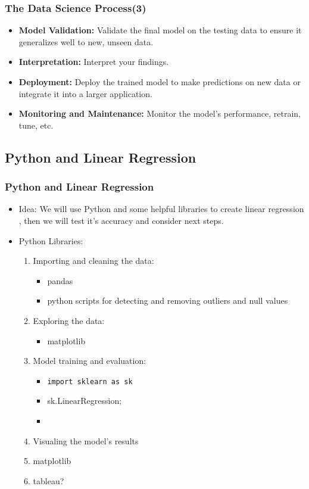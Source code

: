 \documentclass{beamer}
\newcounter{slidenum}
\begin{document}
\begin{frame}
	
	\frametitle{The Data Science Process(3)}
	{\small
	\begin{itemize}
		
  \item \textbf{Model Validation:} Validate the final model on the testing data to ensure it generalizes well to new, unseen data.

  \item \textbf{Interpretation:} Interpret your findings. 

  \item \textbf{Deployment:} Deploy the trained model to make predictions on new data or integrate it into a larger application.

 \item \textbf{Monitoring and Maintenance:} Monitor the model's performance, retrain, tune, etc.
\end{itemize}
}
\end{frame}


\begin{frame}
\section{Python and Linear Regression}
\frametitle{Python and Linear Regression}
{\small
\begin{itemize}
\item Idea: We will use Python and some helpful libraries to create linear
	regression , then we will test it's accuracy and consider next steps.
\item Python Libraries:
	\begin{enumerate}
		\item [] Importing and cleaning the data:
			\begin{itemize}
				\item pandas

				\item python scripts for detecting and removing
					outliers and null values
			\end{itemize}
		\item [] Exploring the data:
			\begin{itemize}
				\item matplotlib 
			\end{itemize}
		\item [] Model training and evaluation: 
			\begin{itemize}
		\item \lstinline{import sklearn as sk}
				\item sk.LinearRegression;
				\item 
			\end{itemize}
		\item [] Visualing the model's results
		\item matplotlib
		\item tableau?
	\end{enumerate}
\end{itemize}
}
\end{frame}
\end{document}
